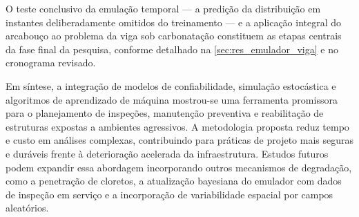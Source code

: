O teste conclusivo da emulação temporal --- a predição da distribuição em instantes deliberadamente omitidos do treinamento --- e a aplicação integral do arcabouço ao problema da viga sob carbonatação constituem as etapas centrais da fase final da pesquisa, conforme detalhado na \autoref{sec:res_emulador_viga} e no cronograma revisado.

Em síntese, a integração de modelos de confiabilidade, simulação estocástica e algoritmos de aprendizado de máquina mostrou-se uma ferramenta promissora para o planejamento de inspeções, manutenção preventiva e reabilitação de estruturas expostas a ambientes agressivos. A metodologia proposta reduz tempo e custo em análises complexas, contribuindo para práticas de projeto mais seguras e duráveis frente à deterioração acelerada da infraestrutura. Estudos futuros podem expandir essa abordagem incorporando outros mecanismos de degradação, como a penetração de cloretos, a atualização bayesiana do emulador com dados de inspeção em serviço e a incorporação de variabilidade espacial por campos aleatórios.
